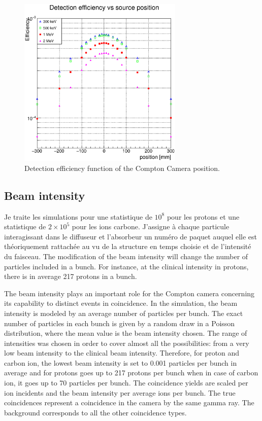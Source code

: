 \documentclass[11pt]{iopart}
\begin{document}
	\begin{figure} [!hbtp]	
	\centering
	\caption{Detection efficiency function of the Compton Camera position.}	
	\includegraphics[width=0.7\textwidth]{./Figure/2017-06-26_Efficiency_CC_articles.eps}
	\end{figure}


\subsection{Beam intensity }
Je traite les simulations pour une statistique de $10^{8}$ pour les protons et une statistique de $2\times10^{5}$ pour les ions carbone.\newline
J'assigne à chaque particule interagissant dans le diffuseur et l'absorbeur un num\'ero de paquet auquel elle est th\'eoriquement rattach\'ee au vu de la structure en temps choisie et de l'intensit\'e du faisceau.
The modification of the beam intensity will change the number of particles included in a bunch. For instance, at the clinical intensity in protons, there is in average 217 protons in a bunch.



The beam intensity plays an important role for the Compton camera concerning its capability to distinct events in coincidence. In the simulation, the beam intensity is modeled by an average number of particles per bunch. The exact number of particles in each bunch is given by a random draw in a Poisson distribution, where the mean value is the beam intensity chosen. The range of intensities was chosen in order to cover almost all the possibilities: from a very low beam intensity to the clinical beam intensity. Therefore, for proton and carbon ion, the lowest beam intensity is set to 0.001 particles per bunch in average and for protons goes up to 217 protons per bunch when in case of carbon ion, it goes up to 70 particles per bunch. The coincidence yields are scaled per ion incidents and the beam intensity per average ions per bunch. The true coincidences represent a coincidence in the camera by the same gamma ray. The background corresponds to all the other coincidence types.
\end{document}

